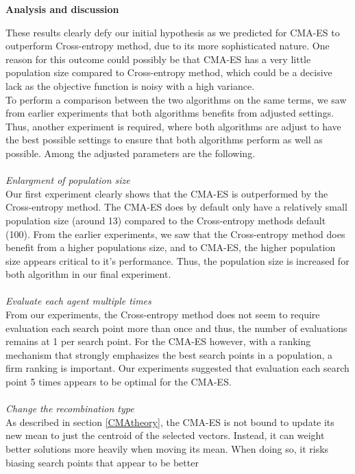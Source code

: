 \textbf{Analysis and discussion}

These results clearly defy our initial hypothesis as we predicted
for CMA-ES to outperform Cross-entropy method, due to its more sophisticated nature. 
One reason for this outcome could possibly be that
CMA-ES has a very little population size compared to Cross-entropy method,
which could be a decisive lack as the objective function is noisy with 
a high variance.\\

To perform a comparison between the two algorithms on the same terms,
we saw from earlier experiments that both algorithms benefits from 
adjusted settings. Thus, another experiment is required, where both algorithms
are adjust to have the best possible settings to ensure that both algorithms
perform as well as possible. Among the adjusted parameters are the following.\\
\\
\textit{Enlargment of population size}\\
Our first experiment clearly shows that the CMA-ES
is outperformed by the Cross-entropy method.
The CMA-ES does by default only have a relatively small
population size (around 13) compared to the Cross-entropy methods
default (100). From the earlier experiments, we saw that 
the Cross-entropy method does benefit from a higher populations size,
and to CMA-ES, the higher population size appears critical
to it's performance. Thus, the population size is increased for 
both algorithm in our final experiment.\\
\\
\textit{Evaluate each agent multiple times}\\
From our experiments, the Cross-entropy method does not
seem to require evaluation each search point more than once
and thus, the number of evaluations remains at 1 per
search point. For the CMA-ES however, with a 
ranking mechanism that strongly emphasizes 
the best search points in a population, a firm
ranking is important. Our experiments suggested that
evaluation each search point 5 times appears to be optimal 
for the CMA-ES.\\
\\
\textit{Change the recombination type}\\
As described in section \ref{CMAtheory}, 
the CMA-ES is not bound to update its 
new mean to just the centroid of the selected 
vectors. Instead, it can weight better solutions
more heavily when moving its mean. When doing so,
it risks biasing search points that appear to be better 
